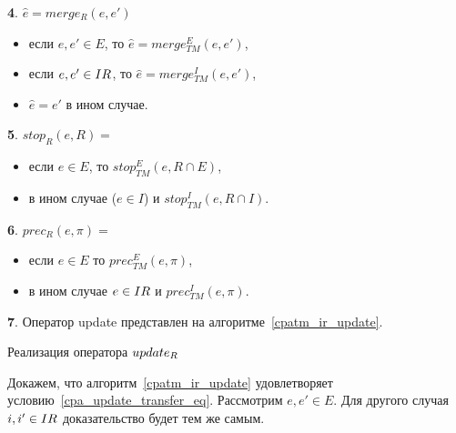 {\textbf 4.}
$\hat e = merge_{R}(e,e')$
\begin{itemize}
\item если $e,e' \in E$, то $\hat e = merge^E_{TM}(e, e')$,
\item если $e,e' \in IR$, то $\hat e = merge^I_{TM}(e, e')$,
\item $\hat e = e'$ в ином случае.
\end{itemize}

{\textbf 5.}
$stop_{R}(e,R)=$
\begin{itemize}
\item если $e \in E$, то $stop^E_{TM}(e, R\cap E)$,
\item в ином случае ($e \in I$) и $stop^I_{TM}(e, R\cap I)$.
\end{itemize}

{\textbf 6.}
$prec_{R}(e,\pi)=$
\begin{itemize}
\item если $e \in E$ то $prec^E_{TM}(e, \pi)$,
\item в ином случае $e \in IR$ и $prec^I_{TM}(e, \pi)$.
\end{itemize}

{\textbf 7.} %
Оператор update представлен на алгоритме~\ref{cpatm_ir_update}.
\begin{algorithm}
 \caption{Реализация оператора $update_R$}
 \label{cpatm_ir_update}
\end{algorithm}

Докажем, что алгоритм~\ref{cpatm_ir_update} удовлетворяет условию~\ref{cpa_update_transfer_eq}.
Рассмотрим $e,e' \in E$. Для другого случая $i,i' \in IR$ доказательство будет тем же самым.

